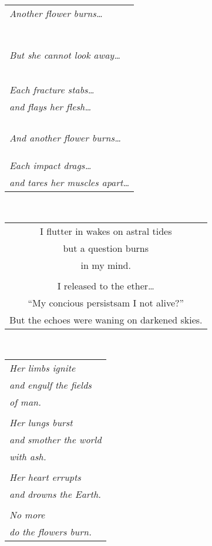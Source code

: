 \documentclass{article}
\begin{document}
\begin{center}
\begin{tabular}{l}
\textit{Another flower burns\ldots} \\
\\
\\
\\
\\
\\
\\
\\
\textit{But she cannot look away\ldots} \\
\\
\\
\\
\\
\\
\textit{Each fracture stabs\ldots} \\
\textit{and flays her flesh\ldots} \\
\\
\\
\\
\\
\textit{And another flower burns\ldots} \\
\\
\\
\\
\textit{Each impact drags\ldots} \\
\textit{and tares her muscles apart\ldots} \\
\end{tabular} \\
\begin{tabular}{c}
\\
I flutter in wakes on astral tides \\
but a question burns \\
in my mind. \\
\\
I released to the ether\ldots{} \\
``My concious persists\hspace{3ex}am I not alive?'' \\
But the echoes were waning on darkened skies. \\
\end{tabular} \\
\begin{tabular}{l}
\\
\textit{Her limbs ignite}\\
\textit{and engulf the fields}\\
\textit{of man.} \\
\\
\textit{Her lungs burst} \\
\textit{and smother the world} \\
\textit{with ash.} \\
\\
\textit{Her heart errupts} \\
\textit{and drowns the Earth.} \\
\\
\textit{No more} \\
\textit{do the flowers burn.} \\
\end{tabular}
\end{center}
\end{document}
